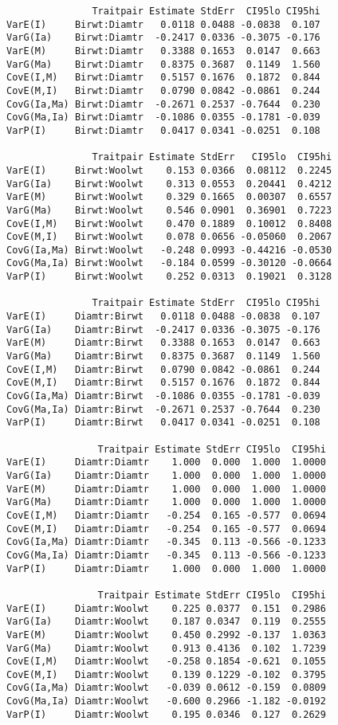 \documentclass[titlepage]{article}  %
\begin{document}
\begin{verbatim}
               Traitpair Estimate StdErr  CI95lo CI95hi
VarE(I)     Birwt:Diamtr   0.0118 0.0488 -0.0838  0.107
VarG(Ia)    Birwt:Diamtr  -0.2417 0.0336 -0.3075 -0.176
VarE(M)     Birwt:Diamtr   0.3388 0.1653  0.0147  0.663
VarG(Ma)    Birwt:Diamtr   0.8375 0.3687  0.1149  1.560
CovE(I,M)   Birwt:Diamtr   0.5157 0.1676  0.1872  0.844
CovE(M,I)   Birwt:Diamtr   0.0790 0.0842 -0.0861  0.244
CovG(Ia,Ma) Birwt:Diamtr  -0.2671 0.2537 -0.7644  0.230
CovG(Ma,Ia) Birwt:Diamtr  -0.1086 0.0355 -0.1781 -0.039
VarP(I)     Birwt:Diamtr   0.0417 0.0341 -0.0251  0.108

               Traitpair Estimate StdErr   CI95lo  CI95hi
VarE(I)     Birwt:Woolwt    0.153 0.0366  0.08112  0.2245
VarG(Ia)    Birwt:Woolwt    0.313 0.0553  0.20441  0.4212
VarE(M)     Birwt:Woolwt    0.329 0.1665  0.00307  0.6557
VarG(Ma)    Birwt:Woolwt    0.546 0.0901  0.36901  0.7223
CovE(I,M)   Birwt:Woolwt    0.470 0.1889  0.10012  0.8408
CovE(M,I)   Birwt:Woolwt    0.078 0.0656 -0.05060  0.2067
CovG(Ia,Ma) Birwt:Woolwt   -0.248 0.0993 -0.44216 -0.0530
CovG(Ma,Ia) Birwt:Woolwt   -0.184 0.0599 -0.30120 -0.0664
VarP(I)     Birwt:Woolwt    0.252 0.0313  0.19021  0.3128

               Traitpair Estimate StdErr  CI95lo CI95hi
VarE(I)     Diamtr:Birwt   0.0118 0.0488 -0.0838  0.107
VarG(Ia)    Diamtr:Birwt  -0.2417 0.0336 -0.3075 -0.176
VarE(M)     Diamtr:Birwt   0.3388 0.1653  0.0147  0.663
VarG(Ma)    Diamtr:Birwt   0.8375 0.3687  0.1149  1.560
CovE(I,M)   Diamtr:Birwt   0.0790 0.0842 -0.0861  0.244
CovE(M,I)   Diamtr:Birwt   0.5157 0.1676  0.1872  0.844
CovG(Ia,Ma) Diamtr:Birwt  -0.1086 0.0355 -0.1781 -0.039
CovG(Ma,Ia) Diamtr:Birwt  -0.2671 0.2537 -0.7644  0.230
VarP(I)     Diamtr:Birwt   0.0417 0.0341 -0.0251  0.108

                Traitpair Estimate StdErr CI95lo  CI95hi
VarE(I)     Diamtr:Diamtr    1.000  0.000  1.000  1.0000
VarG(Ia)    Diamtr:Diamtr    1.000  0.000  1.000  1.0000
VarE(M)     Diamtr:Diamtr    1.000  0.000  1.000  1.0000
VarG(Ma)    Diamtr:Diamtr    1.000  0.000  1.000  1.0000
CovE(I,M)   Diamtr:Diamtr   -0.254  0.165 -0.577  0.0694
CovE(M,I)   Diamtr:Diamtr   -0.254  0.165 -0.577  0.0694
CovG(Ia,Ma) Diamtr:Diamtr   -0.345  0.113 -0.566 -0.1233
CovG(Ma,Ia) Diamtr:Diamtr   -0.345  0.113 -0.566 -0.1233
VarP(I)     Diamtr:Diamtr    1.000  0.000  1.000  1.0000

                Traitpair Estimate StdErr CI95lo  CI95hi
VarE(I)     Diamtr:Woolwt    0.225 0.0377  0.151  0.2986
VarG(Ia)    Diamtr:Woolwt    0.187 0.0347  0.119  0.2555
VarE(M)     Diamtr:Woolwt    0.450 0.2992 -0.137  1.0363
VarG(Ma)    Diamtr:Woolwt    0.913 0.4136  0.102  1.7239
CovE(I,M)   Diamtr:Woolwt   -0.258 0.1854 -0.621  0.1055
CovE(M,I)   Diamtr:Woolwt    0.139 0.1229 -0.102  0.3795
CovG(Ia,Ma) Diamtr:Woolwt   -0.039 0.0612 -0.159  0.0809
CovG(Ma,Ia) Diamtr:Woolwt   -0.600 0.2966 -1.182 -0.0192
VarP(I)     Diamtr:Woolwt    0.195 0.0346  0.127  0.2629


\end{verbatim}
\end{document}

